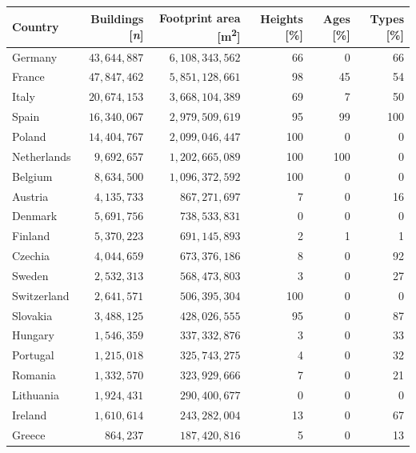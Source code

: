 \documentclass[fleqn,10pt]{wlscirep}
\begin{document}
\begin{table}[h!]
\centering
\renewcommand{\arraystretch}{1.1}
\begin{tabular}{lrrrrr}
\toprule
\textbf{Country} &   \textbf{Buildings [\textit{n}]}  &  \textbf{Footprint area [m\textsuperscript{2}]} &  \textbf{Heights [\%]} &  \textbf{Ages [\%]} &  \textbf{Types [\%]} \\
\midrule
Germany     & $43,644,887$ &  $6,108,343,562$ &      66 &   0 &    66 \\
France      &  $47,847,462$ &  $5,851,128,661$ &      98 &   45 &    54 \\
Italy       &  $20,674,153$ &  $3,668,104,389$ &      69 &   7 &    50 \\
Spain       &  $16,340,067$ &  $2,979,509,619$ &      95 &   99 &    100 \\
Poland      &  $14,404,767$ &  $2,099,046,447$ &      100 &   0 &    0 \\
Netherlands &   $9,692,657$ &  $1,202,665,089$ &      100 &   100 &    0 \\
Belgium     &  $8,634,500$ &  $1,096,372,592$ &      100 &   0 &    0 \\
Austria     &   $4,135,733$ &    $867,271,697$ &      7 &   0 &    16 \\
Denmark     &   $5,691,756$ &    $738,533,831$ &      0 &   0 &    0 \\
Finland     &   $5,370,223$ &    $691,145,893$ &      2 &   1 &    1 \\
Czechia     &   $4,044,659$ &    $673,376,186$ &      8 &   0 &    92 \\
Sweden      &   $2,532,313$ &    $568,473,803$ &      3 &   0 &    27 \\
Switzerland &   $2,641,571$ &    $506,395,304$ &      100 &   0 &    0 \\
Slovakia    &   $3,488,125$ &    $428,026,555$ &      95 &   0 &    87 \\
Hungary     &   $1,546,359$ &    $337,332,876$ &      3 &   0 &    33 \\
Portugal    &   $1,215,018$ &    $325,743,275$ &      4 &   0 &    32 \\
Romania     &   $1,332,570$ &    $323,929,666$ &      7 &   0 &    21 \\
Lithuania   &   $1,924,431$ &    $290,400,677$ &      0 &   0 &    0 \\
Ireland     &   $1,610,614$ &    $243,282,004$ &      13 &   0 &    67 \\
Greece      &     $864,237$ &    $187,420,816$ &      5 &   0 &    13 \\

\end{tabular}
\end{table}
\end{document}
